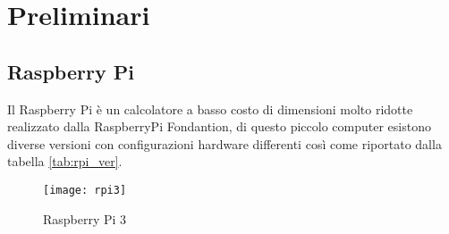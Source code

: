 \chapter{Preliminari}

\ifpdf
    \graphicspath{{Chapter2/Figs/Raster/}{Chapter2/Figs/PDF/}{Chapter2/Figs/}}
\else
    \graphicspath{{Chapter2/Figs/Vector/}{Chapter2/Figs/}}
\fi


\section{Raspberry Pi}

Il Raspberry Pi è un calcolatore  a basso costo  di dimensioni molto ridotte realizzato dalla RaspberryPi Fondantion, di questo piccolo computer esistono diverse versioni con configurazioni hardware differenti così come riportato dalla tabella \ref{tab:rpi_ver}.

\begin{figure}[htbp!] 
	\centering    
	\texttt{[image: rpi3]}
	\caption[RaspberryPi 3]{Raspberry Pi 3}
	\label{fig:rpi3}
\end{figure}

